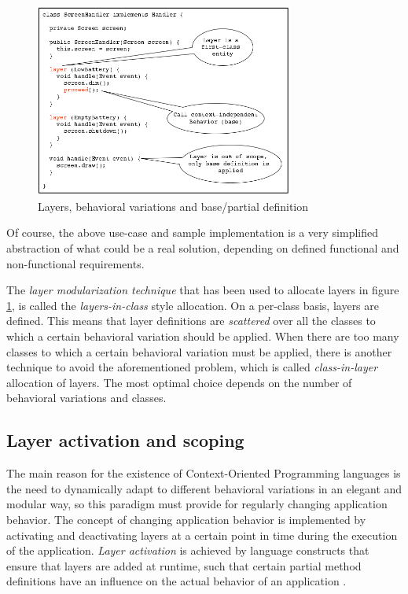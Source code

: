 \documentclass{acm_proc_article-sp}
\begin{document}
\begin{figure}[H]
\centering
\includegraphics[width=85mm]{layers_toy.png}
\caption{Layers, behavioral variations and base/partial definition}
\label{fig:layers}
\end{figure}
Of course, the above use-case and sample implementation is a very simplified abstraction of what could be a real solution, depending on defined functional and non-functional requirements.

The \textit{layer modularization technique }that has been used to allocate layers in figure \ref{fig:layers}, is called the \textit{layers-in-class} style allocation. On a per-class basis, layers are defined. This means that layer definitions are \textit{scattered} over all the classes to which a certain behavioral variation should be applied. When there are too many classes to which a certain behavioral variation must be applied, there is another technique to avoid the aforementioned problem, which is called \textit{class-in-layer} allocation of layers. The most optimal choice depends on the number of behavioral variations and classes.

\subsection{Layer activation and scoping}
\label{sec:layer_activation_scoping}
The main reason for the existence of Context-Oriented Programming languages is the need to dynamically adapt to different behavioral variations in an elegant and modular way, so this paradigm must provide for regularly changing application behavior. The concept of changing  application behavior is implemented by activating and deactivating layers at a certain point in time during the execution of the application. \textit{Layer activation} is achieved by language constructs that ensure that layers are added at runtime, such that certain partial method definitions have an influence on the actual behavior of an application \cite{Kamina:2014:CSE:2577080.2579816}. 
\end{document}
